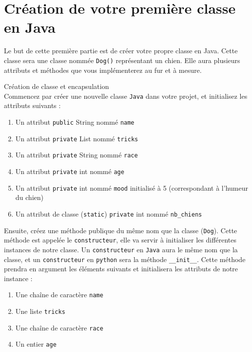 \section{Création de votre première classe en Java}

Le but de cette première partie est de créer votre propre classe en Java. Cette classe sera une classe nommée \lstinline{Dog()} représentant un chien. Elle aura plusieurs attributs et méthodes que vous implémenterez au fur et à mesure.

\begin{Exercice}[10 minutes] Création de classe et encapsulation\\
    Commencez par créer une nouvelle classe \lstinline{Java} dans votre projet, et initialisez les attributs suivants :
    \begin{enumerate}
    \item Un attribut \lstinline{public} String nommé \lstinline{name}
    \item Un attribut \lstinline{private} List nommé \lstinline{tricks}
    \item Un attribut \lstinline{private} String nommé \lstinline{race}
    \item Un attribut \lstinline{private} int nommé \lstinline{age}
    \item Un attribut \lstinline{private} int nommé \lstinline{mood} initialisé à 5 (correspondant à l'humeur du chien)
    \item Un attribut de classe (\lstinline{static}) \lstinline{private} int nommé \lstinline{nb_chiens}
   	\end{enumerate}
   	
   	Ensuite, créez une méthode publique du même nom que la classe (\lstinline{Dog}). Cette méthode est appelée le \lstinline{constructeur}, elle va servir à initialiser les différentes instances de notre classe. Un \lstinline{constructeur} en \lstinline{Java} aura le même nom que la classe, et un \lstinline{constructeur} en \lstinline{python} sera la méthode \lstinline{__init__}. Cette méthode prendra en argument les éléments suivants et initialisera les attributs de notre instance :
   	\begin{enumerate}
    \item Une chaîne de caractère \lstinline{name}
    \item Une liste \lstinline{tricks}
    \item Une chaîne de caractère \lstinline{race}
    \item Un entier \lstinline{age}
   	\end{enumerate}
   	

\end{Exercice}
